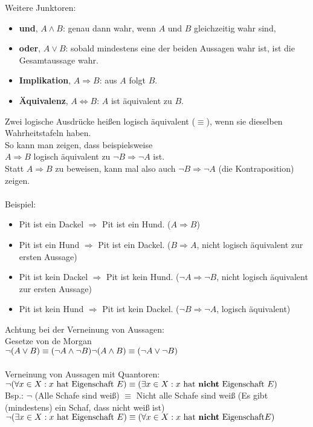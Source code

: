 \documentclass[a4paper,11pt]{article}
\begin{document}
\newpage
Weitere Junktoren:
\begin{itemize}
\item \textbf{und}, $A \land B$: genau dann wahr, wenn $A$ und $B$ gleichzeitig wahr sind,
\item \textbf{oder}, $A \lor B$: sobald mindestens eine der beiden Aussagen wahr ist, ist die Gesamtaussage wahr.
\item \textbf{Implikation}, $A \Rightarrow B$: aus $A$ folgt $B$.
\item \textbf{Äquivalenz}, $A \Leftrightarrow B$: $A$ ist äquivalent zu $B$.
\end{itemize}
Zwei logische Ausdrücke heißen logisch äquivalent ($\equiv$), wenn sie dieselben Wahrheitstafeln haben. \\
So kann man zeigen, dass beispielsweise \\
\makebox[20mm][l]{ }$A \Rightarrow B$ logisch äquivalent zu $\lnot B \Rightarrow \lnot A$ ist. \\
Statt $A \Rightarrow B$ zu beweisen, kann mal also auch $\lnot B \Rightarrow \lnot A$ (die Kontraposition) zeigen. \\~\\
Beispiel:
\begin{itemize}
\item Pit ist ein Dackel $\Rightarrow$ Pit ist ein Hund. ($A\Rightarrow B$)
\item Pit ist ein Hund $\Rightarrow$ Pit ist ein Dackel. ($B \Rightarrow A$, nicht logisch äquivalent zur ersten Aussage)
\item Pit ist kein Dackel $\Rightarrow$ Pit ist kein Hund. ($\lnot A \Rightarrow \lnot B$, nicht logisch äquivalent zur ersten Aussage)
\item Pit ist kein Hund $\Rightarrow$ Pit ist kein Dackel. ($\lnot B\Rightarrow \lnot A$, logisch äquivalent)
\end{itemize}
Achtung bei der Verneinung von Aussagen: \\
Gesetze von de Morgan \\
$\lnot (A \lor B) \equiv (\lnot A \land \lnot B) \\
\lnot (A \land B) \equiv (\lnot A \lor \lnot B)$ \\~\\
Verneinung von Aussagen mit Quantoren: \\
$\lnot(\forall x\in X : x \text{ hat Eigenschaft } E) \equiv (\exists x \in X : x \text{ hat \textbf{nicht} Eigenschaft } E)$ \\
Bsp.: $\lnot$ (Alle Schafe sind weiß) $\equiv$ Nicht alle Schafe sind weiß (Es gibt (mindestens) ein Schaf, dass nicht weiß ist) \\
$\lnot(\exists x \in X : x \text{ hat Eigenschaft }E) \equiv (\forall x \in X : x \text{ hat \textbf{nicht} Eigenschaft} E)$
\end{document}
